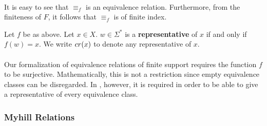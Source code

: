 \paragraph{}
It is easy to see that $\equiv_f$ is an equivalence relation. 
Furthermore, from the finiteness of $F$, it follows that $\equiv_f$ is of finite index.
%

\begin{definition}
    Let $f$ be as above. 
    Let $x \in X$. $w \in \Sigma^*$ is a \textbf{representative} of $x$ if and only if $f(w) = x$.
    We write $cr(x)$ to denote any representative of $x$.
\end{definition}



\paragraph{}
Our formalization of equivalence relations of finite support requires the function $f$ to be surjective. 
Mathematically, this is not a restriction since empty equivalence classes can be disregarded.
In \coq, however, it is required in order to be able to give a representative of every equivalence class.



\subsubsection{Myhill Relations}

